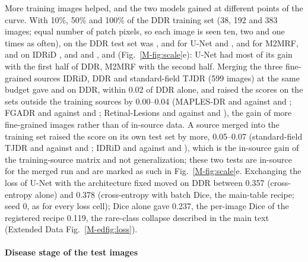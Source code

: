 More training images helped, and the two models gained at different points of the curve. With 10\%, 50\% and 100\% of the DDR training set (38, 192 and 383 images; equal number of patch pixels, so each image is seen ten, two and one times as often), \mAUPR{} on the DDR test set was ,  and  for U-Net and ,  and  for M2MRF, and on IDRiD ,  and  and ,  and  (Fig.~\ref{M-fig:scale}e): U-Net had most of its gain with the first half of DDR, M2MRF with the second half. Merging the three fine-grained sources IDRiD, DDR and standard-field TJDR (599 images) at the same budget gave  and  on DDR, within 0.02 of DDR alone, and raised the scores on the sets outside the training sources by 0.00--0.04 (MAPLES-DR  and  against  and ; FGADR  and  against  and ; Retinal-Lesions  and  against  and ), the gain of more fine-grained images rather than of in-source data. A source merged into the training set raised the score on its own test set by more, 0.05--0.07 (standard-field TJDR  and  against  and ; IDRiD  and  against  and ), which is the in-source gain of the training-source matrix and not generalization; these two tests are in-source for the merged run and are marked as such in Fig.~\ref{M-fig:scale}e. Exchanging the loss of U-Net with the architecture fixed moved \mAUPR{} on DDR between 0.357 (cross-entropy alone) and 0.378 (cross-entropy with batch Dice, the main-table recipe; seed 0, as for every loss cell); Dice alone gave 0.237, the per-image Dice of the registered recipe 0.119, the rare-class collapse described in the main text (Extended Data Fig.~\ref{M-edfig:loss}).

\paragraph{Disease stage of the test images}

